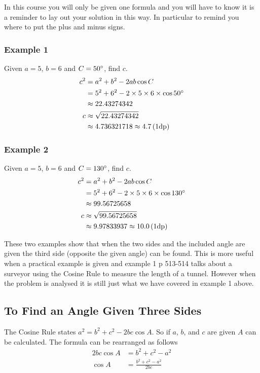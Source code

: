 In this course you will only be given one formula and you will have to know it is a reminder to
lay out your solution in this way. In particular to remind you where to put the plus and minus signs. 

\subsubsection{Example 1}
Given $a =5$, $b =6$ and $C =50 \mbox{{\ensuremath{{}^\circ}}}$, find $c$.
\begin{align*}c^{2} &  = a^{2} +b^{2} -2 a b \cos  C \\
 &  = 5^{2} +6^{2} -2 \times 5 \times 6 \times \cos  50 \mbox{{\ensuremath{{}^\circ}}} \\
 &  \approx   22.43274342 \\
c &  \approx   \sqrt{22.43274342} \\
 &  \approx   4.736321718 \approx 4.7 \left (1\text{dp}\right )\end{align*}

\subsubsection{Example 2}
Given $a =5$, $b =6$ and $C =130 \mbox{{\ensuremath{{}^\circ}}}$, find $c$.
\begin{align*}c^{2} &  = a^{2} +b^{2} -2 a b \cos  C \\
 &  = 5^{2} +6^{2} -2 \times 5 \times 6 \times \cos  130 \mbox{{\ensuremath{{}^\circ}}} \\
 &  \approx   99.56725658 \\
c &  \approx   \sqrt{99.56725658} \\
 &  \approx   9.97833937 \approx 10.0 \left (1\text{dp}\right )\end{align*}

These two examples show that when the two sides and the included angle are given the third side
(opposite the given angle) can be found. This is more useful when a practical example is given and example 1
p 513-514 talks about a surveyor using the Cosine Rule to measure the length of a tunnel. However when the problem
is analysed it is still just what we have covered in example 1 above. 

\subsection{To Find an Angle Given Three Sides}
The Cosine Rule states $a^{2} =b^{2} +c^{2} -2 b c \cos  A\text{.}$ So if $a$, $b$, and $c$ are given $A$ can be calculated. The formula can be rearranged as follows
\begin{align*}2 b c \cos  A &  = b^{2} +c^{2} -a^{2} \\
\cos  A &  = \frac{b^{2} +c^{2} -a^{2}}{2 b c}\end{align*}



